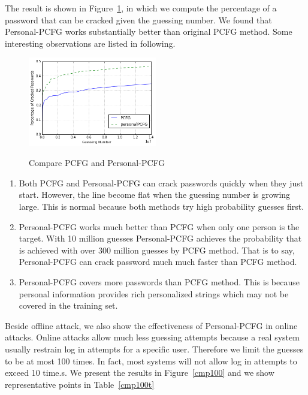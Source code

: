 \documentclass{sig-alternate}
\begin{document}
The result is shown in Figure~\ref{f3}, in which we compute the percentage of a password that can be cracked given the guessing number. We found that Personal-PCFG works substantially better than original PCFG method. Some interesting observations are listed in following.

\begin{figure}[h!]
\centering
  \caption{Compare PCFG and Personal-PCFG}{}
  \label{f3}
  \centering
    \includegraphics[width=0.5\textwidth]{fig/cmp}
\end{figure}

\begin{enumerate}[leftmargin=*]
\item Both PCFG and Personal-PCFG can crack passwords quickly when they just start. However, the line become flat when the guessing number is growing large. This is normal because both methods try high probability guesses first. 

\item Personal-PCFG works much better than PCFG when only one person is the target. With 10 million guesses Personal-PCFG achieves the probability that is achieved with over 300 million guesses by PCFG method. That is to say, Personal-PCFG can crack password much much faster than PCFG method. 

\item Personal-PCFG covers more passwords than PCFG method. This is because personal information provides rich personalized strings which may not  be covered in the training set.  

\end{enumerate}

Beside offline attack, we also show the effectiveness of Personal-PCFG in online attacks. Online attacks allow much less guessing attempts because a real system usually restrain log in attempts for a specific user. Therefore we limit the guesses to be at most 100 times. In fact, most systems will not allow log in attempts to exceed 10 time.s. We present the results in Figure~\ref{cmp100} and we show representative points in Table~\ref{cmp100t}
\end{document}
